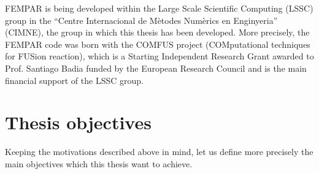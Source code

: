 FEMPAR is being developed within the Large Scale Scientific Computing (LSSC) group in the ``Centre Internacional de Mètodes Numèrics en Enginyeria'' (CIMNE), the group in which this thesis has been developed. More precisely, the FEMPAR code was born with the COMFUS project (COMputational techniques for FUSion reaction), which is a Starting Independent Research Grant awarded to Prof. Santiago Badia funded by the European Research Council and is the main financial support of the LSSC group.
 

\section{Thesis objectives}
\label{sec-C1_objectives}

Keeping the motivations described above in mind, let us define more precisely the main objectives which this thesis want to achieve.

